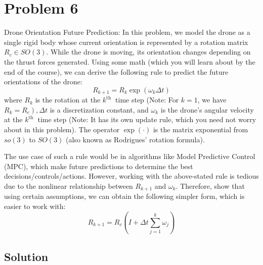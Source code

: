 \section*{Problem 6}

Drone Orientation Future Prediction:
In this problem, we model the drone as a single rigid body whose current orientation is represented by a rotation matrix \(R_{c} \in S O(3)\).
While the drone is moving, its orientation changes depending on the thrust forces generated.
Using some math (which you will learn about by the end of the course), we can derive the following rule to predict the future orientations of the drone:
\begin{equation*}
    R_{k+1}=R_{k} \exp \left(\omega_{k} \Delta t\right)
\end{equation*}
where \(R_{k}\) is the rotation at the \(k^{\text {th }}\) time step
(Note: For \(k=1\), we have \(\left.R_{k}=R_{c}\right), \Delta t\)
is a discretization constant, and \(\omega_{k}\) is the drone's angular velocity at the \(k^{\text {th }}\) time step
(Note: It has its own update rule, which you need not worry about in this problem).
The operator \(\exp (\cdot)\) is the matrix exponential from \(s o(3)\) to \(S O(3)\) (also known as Rodrigues' rotation formula).

The use case of such a rule would be in algorithms like Model Predictive Control (MPC), which make future predictions to determine the best decisions/controls/actions.
However, working with the above-stated rule is tedious due to the nonlinear relationship between \(R_{k+1}\) and \(\omega_{k}\).
Therefore, show that using certain assumptions, we can obtain the following simpler form, which is easier to work with:
\begin{equation*}
    R_{k+1}=R_{c}\left(I+\Delta t \sum_{j=1}^{k} \omega_{j}\right)
\end{equation*}

\subsection*{Solution}
